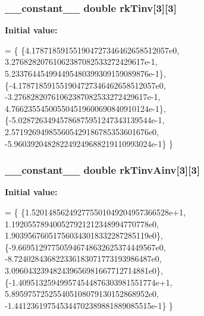 \subsubsection[{\texorpdfstring{rk\+Tinv}{rkTinv}}]{\setlength{\rightskip}{0pt plus 5cm}\+\_\+\+\_\+constant\+\_\+\+\_\+ double rk\+Tinv\mbox{[}3\mbox{]}\mbox{[}3\mbox{]}}\hypertarget{radau2a_8cu_a0544fa464c96867fbe9b2db33c118361}{}\label{radau2a_8cu_a0544fa464c96867fbe9b2db33c118361}
{\bfseries Initial value\+:}
\begin{DoxyCode}
= \{
\{4.178718591551904727346462658512057e0,
3.27682820761062387082533272429617e-1,
5.233764454994495480399309159089876e-1\},
\{-4.178718591551904727346462658512057e0,
-3.27682820761062387082533272429617e-1,
4.766235545005504519600690840910124e-1\},
\{-5.02872634945786875951247343139544e-1,
2.571926949855605429186785353601676e0,
-5.960392048282249249688219110993024e-1\}
\}
\end{DoxyCode}
\subsubsection[{\texorpdfstring{rk\+Tinv\+Ainv}{rkTinvAinv}}]{\setlength{\rightskip}{0pt plus 5cm}\+\_\+\+\_\+constant\+\_\+\+\_\+ double rk\+Tinv\+Ainv\mbox{[}3\mbox{]}\mbox{[}3\mbox{]}}\hypertarget{radau2a_8cu_a954ecd55208794555a1cd474035c742f}{}\label{radau2a_8cu_a954ecd55208794555a1cd474035c742f}
{\bfseries Initial value\+:}
\begin{DoxyCode}
= \{
\{1.520148562492775501049204957366528e+1,
1.192055789400527921212348994770778e0,
1.903956760517560343018332287285119e0\},
\{-9.669512977505946748632625374449567e0,
-8.724028436822336183071773193986487e0,
3.096043239482439656981667712714881e0\},
\{-1.409513259499574544876303981551774e+1,
5.895975725255405108079130152868952e0,
-1.441236197545344702389881889085515e-1\}
\}
\end{DoxyCode}
